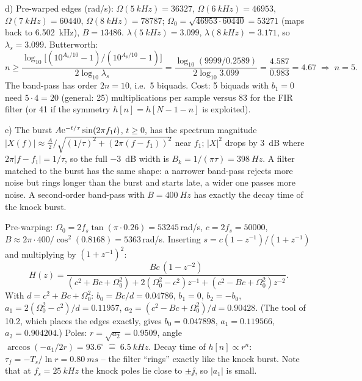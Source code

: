 \begin{solution}
d) Pre-warped edges (rad/s): $\Omega(\SI{5}{kHz})=36327$, $\Omega(\SI{6}{kHz})=46953$,
$\Omega(\SI{7}{kHz})=60440$, $\Omega(\SI{8}{kHz})=78787$;
$\Omega_0=\sqrt{46953\cdot60440}=53271$ (maps back to \SI{6.502}{kHz}),
$B=13486$. $\lambda(\SI{5}{kHz})=3.099$, $\lambda(\SI{8}{kHz})=3.171$,
so $\lambda_s=3.099$. Butterworth:
\[
  n\ge\frac{\log_{10}\bigl[(10^{A_s/10}-1)/(10^{A_p/10}-1)\bigr]}{2\log_{10}\lambda_s}
   =\frac{\log_{10}(9999/0.2589)}{2\log_{10}3.099}=\frac{4.587}{0.983}=4.67
   \;\Rightarrow\; n=5 .
\]
The band-pass has order $2n=10$, i.e.\ 5 biquads. Cost: 5 biquads with
$b_1=0$ need $5\cdot4=20$ (general: 25) multiplications per sample versus
83 for the FIR filter (or 41 if the symmetry $h[n]=h[N-1-n]$ is exploited).

e) The burst $A\mathrm{e}^{-t/\tau}\sin(2\pi f_1t)$, $t\ge0$, has the spectrum magnitude
$|X(f)|\approx \tfrac{A}{2}\big/\sqrt{(1/\tau)^2+(2\pi(f-f_1))^2}$ near $f_1$;
$|X|^2$ drops by \SI{3}{dB} where $2\pi|f-f_1|=1/\tau$, so the full
\SI{-3}{dB} width is $B_k=1/(\pi\tau)=\SI{398}{Hz}$. A filter matched to the
burst has the same shape: a narrower band-pass rejects more noise but rings
longer than the burst and starts late, a wider one passes more noise. A
second-order band-pass with $B=\SI{400}{Hz}$ has exactly the decay time of the
knock burst.

Pre-warping: $\Omega_0=2f_s\tan(\pi\cdot 0.26)=53245$\,rad/s, $c=2f_s=50000$,
$B\approx 2\pi\cdot400/\cos^2(0.8168)=5363$\,rad/s. Inserting
$s=c(1-z^{-1})/(1+z^{-1})$ and multiplying by $(1+z^{-1})^2$:
\[
  H(z)=\frac{Bc\,(1-z^{-2})}{(c^2+Bc+\Omega_0^2)+2(\Omega_0^2-c^2)z^{-1}+(c^2-Bc+\Omega_0^2)z^{-2}} .
\]
With $d=c^2+Bc+\Omega_0^2$: $b_0=Bc/d=0.04786$, $b_1=0$, $b_2=-b_0$,
$a_1=2(\Omega_0^2-c^2)/d=0.11957$, $a_2=(c^2-Bc+\Omega_0^2)/d=0.90428$.
(The tool of 10.2, which places the edges exactly, gives
$b_0=0.047898$, $a_1=0.119566$, $a_2=0.904204$.)
Poles: $r=\sqrt{a_2}=0.9509$, angle $\arccos(-a_1/2r)=93.6^\circ\;\hat{=}\;\SI{6.5}{kHz}$.
Decay time of $h[n]\propto r^n$: $\tau_f=-T_s/\ln r=\SI{0.80}{ms}$ --
the filter ``rings'' exactly like the knock burst. Note that at $f_s=\SI{25}{kHz}$
the knock poles lie close to $\pm\jj$, so $|a_1|$ is small.
\end{solution}

